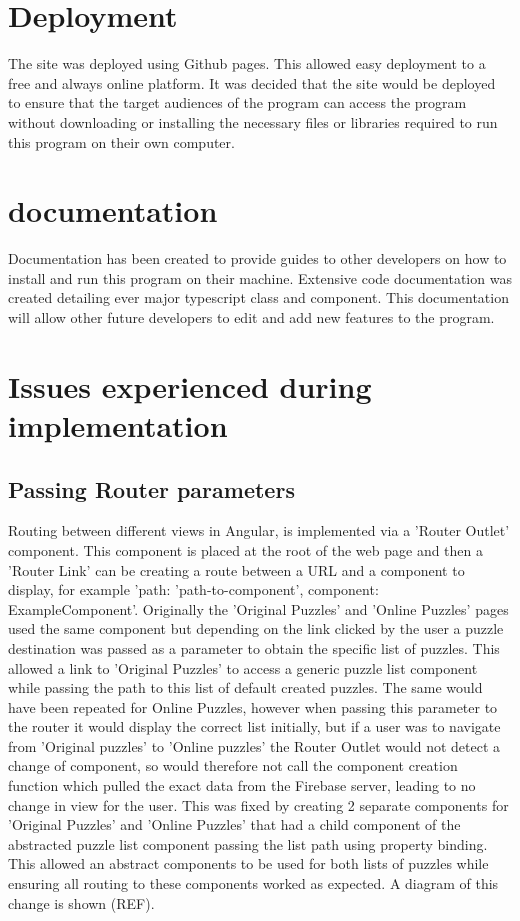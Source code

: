 \documentclass{l4proj}
\begin{document}
\section{Deployment}
The site was deployed using Github pages. This allowed easy deployment to a free and always online platform. It was decided that the site would be deployed to ensure that the target audiences of the program can access the program without downloading or installing the necessary files or libraries required to run this program on their own computer. 

\section{documentation}
Documentation has been created to provide guides to other developers on how to install and run this program on their machine. Extensive code documentation was created detailing ever major typescript class and component. This documentation will allow other future developers to edit and add new features to the program.


\section{Issues experienced during implementation}
\subsection{Passing Router parameters}
Routing between different views in Angular, is implemented via a 'Router Outlet' component. This component is placed at the root of the web page and then a 'Router Link' can be creating a route between a URL and a component to display, for example '{path: 'path-to-component', component: ExampleComponent}'. Originally the 'Original Puzzles' and 'Online Puzzles' pages used the same component but depending on the link clicked by the user a puzzle destination was passed as a parameter to obtain the specific list of puzzles. This allowed a link to 'Original Puzzles' to access a generic puzzle list component while passing the path to this list of default created puzzles. The same would have been repeated for Online Puzzles, however when passing this parameter to the router it would display the correct list initially, but if a user was to navigate from 'Original puzzles' to 'Online puzzles' the Router Outlet would not detect a change of component, so would therefore not call the component creation function which pulled the exact data from the Firebase server, leading to no change in view for the user. This was fixed by creating 2 separate components for 'Original Puzzles' and 'Online Puzzles' that had a child component of the abstracted puzzle list component passing the list path using property binding. This allowed an abstract components to be used for both lists of puzzles while ensuring all routing to these components worked as expected. A diagram of this change is shown (REF). 
\end{document}
